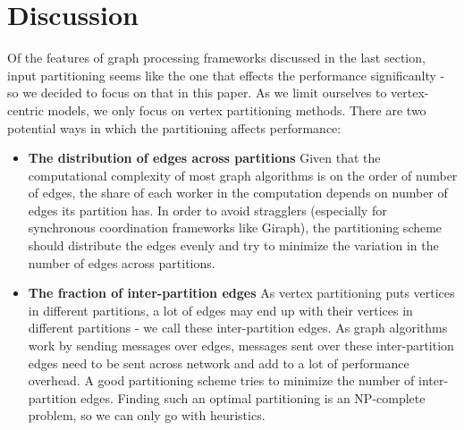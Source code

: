 \section{Discussion}
\label{sec:discussion}

Of the features of graph processing frameworks discussed in the last section,
input partitioning seems like the one that effects the performance significanlty 
- so we decided to focus on that in this paper. As we limit ourselves to vertex-centric models, 
we only focus on vertex partitioning methods. There are two potential ways in which the 
partitioning affects performance:
\begin{itemize}
    \item \textbf{The distribution of edges across partitions} Given that the computational complexity 
    of most graph algorithms is on the order of number of edges, the share of each worker in the 
    computation depends on number of edges its partition has. In order to avoid stragglers 
    (especially for synchronous coordination frameworks like Giraph), the partitioning scheme
    should distribute the edges evenly and try to minimize the variation in the number of edges 
    across partitions.
    \item \textbf{The fraction of inter-partition edges} As vertex partitioning puts vertices
    in different partitions, a lot of edges may end up with their vertices in different 
    partitions - we call these inter-partition edges. As graph algorithms work by sending 
    messages over edges, messages sent over these inter-partition edges need to be sent across network
    and add to a lot of performance overhead. A good partitioning scheme tries to minimize the 
    number of inter-partition edges. Finding such an optimal partitioning is an NP-complete problem, 
    so we can only go with heuristics.
\end{itemize}

